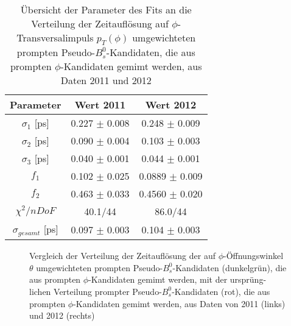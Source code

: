 \documentclass{article}
\begin{document}
\begin{table}[h!]
\noindent \begin{centering}
\begin{tabular}{c|c|c}
Parameter&Wert 2011&Wert 2012\tabularnewline
\hline 
$\sigma_1$ [ps] & 0.227 $\pm$ 0.008 & 0.248 $\pm$ 0.009 \tabularnewline
$\sigma_2$ [ps]& 0.090 $\pm$ 0.004  & 0.103 $\pm$ 0.003 \tabularnewline
$\sigma_3$ [ps]& 0.040 $\pm$ 0.001 & 0.044 $\pm$ 0.001 \tabularnewline
$f_1$ & 0.102 $\pm$ 0.025 & 0.0889 $\pm$ 0.009   \tabularnewline
$f_2$ & 0.463 $\pm$ 0.033 & 0.4560 $\pm$ 0.020 \tabularnewline
\hline
$\chi^2/nDoF$ & 40.1/44 & 86.0/44\tabularnewline
\hline
$\sigma_{gesamt}$ [ps]&0.097 $\pm$ 0.003&0.104 $\pm$ 0.003 \tabularnewline
\end{tabular}
\par \end{centering}
\caption{Übersicht der Parameter des Fits an die Verteilung der Zeitauflösung auf $\phi$-Transversalimpuls $p_T(\phi)$ umgewichteten prompten Pseudo-$B_s^0$-Kandidaten, die aus prompten $\phi$-Kandidaten gemimt werden, aus Daten 2011 und 2012}
\label{table:fitpromptdatare}
\end{table}

\begin{figure}[h!]
\caption{Vergleich der Verteilung der Zeitauflösung der auf $\phi$-Öffnungswinkel $\theta$ umgewichteten prompten Pseudo-$B_s^0$-Kandidaten (dunkelgrün), die aus prompten $\phi$-Kandidaten gemimt werden, mit der ursprüng-lichen Verteilung prompter Pseudo-$B_s^0$-Kandidaten (rot), die aus prompten $\phi$-Kandidaten gemimt werden, aus Daten von 2011 (links) und 2012 (rechts)}
\label{fig:trestheta}
\end{figure} 
\end{document}
